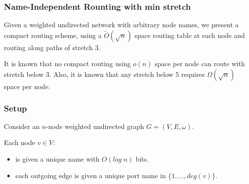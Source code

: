 \begin{frame}[fragile]
  \frametitle{Name-Independent Rounting with min stretch}
    Given a weighted undirected network with arbitrary node names, we present
    a compact routing scheme, using a $\tilde{O}(\sqrt{n})$ space routing
    table at each node and routing along paths of stretch 3.

    It is known that no compact routing using $o(n)$ space per node can route
    with stretch below 3. Also, it is known that any stretch below 5 requires
    $\Omega(\sqrt{n})$ space per node.
\end{frame}

\begin{frame}[fragile]
  \frametitle{Setup}
    Consider an $n$-node weighted undirected graph $G=(V,E,\omega)$.

    Each node $v\in V$:
    \begin{itemize}
        \item is given a unique name with $O(log\; n)$ bits.
        \item each outgoing edge is given a unique port name in $\{1,\dots,deg(v)\}$.
    \end{itemize}
\end{frame}
